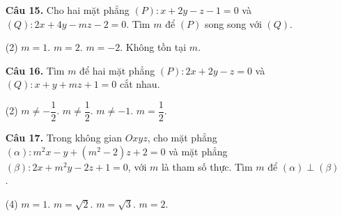 \documentclass[12pt, a4paper]{article}
\begin{document}
\begin{enumerate}[label=\textbf{\arabic*.}, wide=0pt, leftmargin=*]
    \item[\textbf{Câu 15.}] Cho hai mặt phẳng \((P) : x + 2y - z - 1 = 0\) và \((Q) : 2x + 4y - mz - 2 = 0\). Tìm \(m\) để \((P)\) song song với \((Q)\).
    \begin{tasks}(2)
        \task \(m = 1\).
        \task \(m = 2\).
        \task \(m = -2\).
        \task Không tồn tại \(m\).
    \end{tasks}

    \item[\textbf{Câu 16.}] Tìm \(m\) để hai mặt phẳng \((P) : 2x + 2y - z = 0\) và \((Q) : x + y + mz + 1 = 0\) cắt nhau.
    \begin{tasks}(2)
        \task \(m \neq -\dfrac{1}{2}\).
        \task \(m \neq \dfrac{1}{2}\).
        \task \(m \neq -1\).
        \task \(m = \dfrac{1}{2}\).
    \end{tasks}
    
    \item[\textbf{Câu 17.}] Trong không gian \(Oxyz\), cho mặt phẳng \((\alpha): m^2x - y + (m^2 - 2)z + 2 = 0\) và mặt phẳng \((\beta): 2x + m^2y - 2z + 1 = 0\), với \(m\) là tham số thực. Tìm \(m\) để \((\alpha) \perp (\beta)\).
    \begin{tasks}(4)
        \task \(m=1\).
        \task \(m = \sqrt{2}\).
        \task \(m = \sqrt{3}\).
        \task \(m = 2\).
    \end{tasks}
\end{enumerate}

\end{document}

